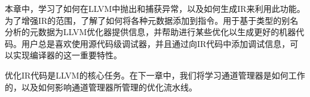 本章中，学习了如何在LLVM中抛出和捕获异常，以及如何生成IR来利用此功能。为了增强IR的范围，了解了如何将各种元数据添加到指令。用于基于类型的别名分析的元数据为LLVM优化器提供信息，并帮助进行某些优化以生成更好的机器代码。用户总是喜欢使用源代码级调试器，并且通过向IR代码中添加调试信息，可以实现编译器的这一重要特性。

优化IR代码是LLVM的核心任务。在下一章中，我们将学习通道管理器是如何工作的，以及如何影响通道管理器所管理的优化流水线。